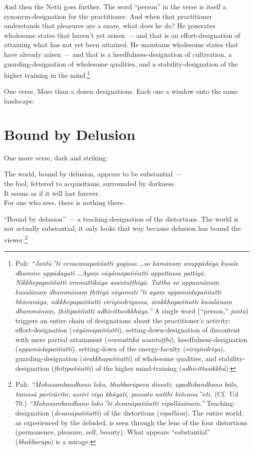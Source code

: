And then the Netti goes further. The word ``person'' in the verse is itself a synonym-designation for the practitioner. And when that practitioner understands that pleasures are a snare, what does he do? He generates wholesome states that haven't yet arisen --- and that is an effort-designation of attaining what has not yet been attained. He maintains wholesome states that have already arisen --- and that is a heedfulness-designation of cultivation, a guarding-designation of wholesome qualities, and a stability-designation of the higher training in the mind.\footnote{Pali: \textit{``Jantū\,''ti vevacanapaññatti yogissa \ldots so kāmānaṃ anuppādāya kusale dhamme uppādayati \ldots Ayaṃ vāyāmapaññatti appattassa pattiyā. Nikkhepapaññatti oramattikāya asantuṭṭhiyā. Tattha so uppannānaṃ kusalānaṃ dhammānaṃ ṭhitiyā vāyamatī\,''ti ayaṃ appamādapaññatti bhāvanāya, nikkhepapaññatti vīriyindriyassa, ārakkhapaññatti kusalānaṃ dhammānaṃ, ṭhitipaññatti adhicittasikkhāya.''} A single word (``person,'' \textit{jantu}) triggers an entire chain of designations about the practitioner's activity: effort-designation (\textit{vāyāmapaññatti}), setting-down-designation of discontent with mere partial attainment (\textit{oramattikā asantuṭṭhi}), heedfulness-designation (\textit{appamādapaññatti}), setting-down of the energy-faculty (\textit{vīriyindriya}), guarding-designation (\textit{ārakkhapaññatti}) of wholesome qualities, and stability-designation (\textit{ṭhitipaññatti}) of the higher mind-training (\textit{adhicittasikkhā}).}

One verse. More than a dozen designations. Each one a window onto the same landscape.

\section*{Bound by Delusion}

One more verse, dark and striking:

\begin{versebox}
The world, bound by delusion, appears to be substantial ---\\
the fool, fettered to acquisitions, surrounded by darkness.\\
It seems as if it will last forever.\\
For one who sees, there is nothing there.
\end{versebox}

``Bound by delusion'' --- a teaching-designation of the distortions. The world is not actually substantial; it only looks that way because delusion has bound the viewer.\footnote{Pali: \textit{``Mohasambandhano loko, bhabbarūpova dissati; upadhibandhano bālo, tamasā parivārito; assirī viya khāyati, passato natthi kiñcana\,''nti.} (Cf.\ Ud 70.) \textit{``Mohasambandhano loko\,''ti desanāpaññatti vipallāsānaṃ.''} Teaching-designation (\textit{desanāpaññatti}) of the distortions (\textit{vipallāsa}). The entire world, as experienced by the deluded, is seen through the lens of the four distortions (permanence, pleasure, self, beauty). What appears ``substantial'' (\textit{bhabbarūpa}) is a mirage.}

